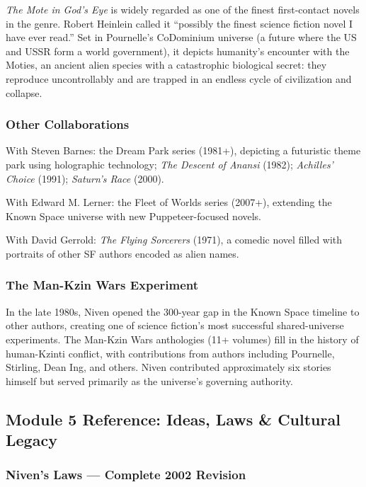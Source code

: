 \documentclass[11pt,letterpaper]{article}
\begin{document}
\textit{The Mote in God's Eye} is widely regarded as one of the finest first-contact novels in the genre. Robert Heinlein called it ``possibly the finest science fiction novel I have ever read.'' Set in Pournelle's CoDominium universe (a future where the US and USSR form a world government), it depicts humanity's encounter with the Moties, an ancient alien species with a catastrophic biological secret: they reproduce uncontrollably and are trapped in an endless cycle of civilization and collapse.

\subsubsection{Other Collaborations}

With Steven Barnes: the Dream Park series (1981+), depicting a futuristic theme park using holographic technology; \textit{The Descent of Anansi} (1982); \textit{Achilles' Choice} (1991); \textit{Saturn's Race} (2000).

With Edward M. Lerner: the Fleet of Worlds series (2007+), extending the Known Space universe with new Puppeteer-focused novels.

With David Gerrold: \textit{The Flying Sorcerers} (1971), a comedic novel filled with portraits of other SF authors encoded as alien names.

\subsubsection{The Man-Kzin Wars Experiment}

In the late 1980s, Niven opened the 300-year gap in the Known Space timeline to other authors, creating one of science fiction's most successful shared-universe experiments. The Man-Kzin Wars anthologies (11+ volumes) fill in the history of human-Kzinti conflict, with contributions from authors including Pournelle, Stirling, Dean Ing, and others. Niven contributed approximately six stories himself but served primarily as the universe's governing authority.

\subsection{Module 5 Reference: Ideas, Laws \& Cultural Legacy}

\subsubsection{Niven's Laws --- Complete 2002 Revision}
\end{document}
